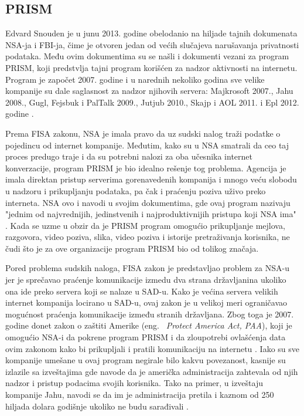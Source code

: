 \documentclass[a4paper]{article}
\begin{document}
\subsection{PRISM}
\label{subsec:prism}
Edvard Snouden je u junu 2013. godine obelodanio na hiljade tajnih dokumenata NSA-ja i FBI-ja, čime je otvoren jedan od većih slučajeva narušavanja privatnosti podataka. Među ovim dokumentima su se našli i dokumenti vezani za program PRISM, koji predstvlja tajni program korišćen za nadzor aktivnosti na internetu. Program je započet 2007. godine i u narednih nekoliko godina sve velike kompanije su dale saglasnost za nadzor njihovih servera: Majkrosoft 2007., Jahu 2008., Gugl, Fejsbuk i PalTalk 2009., Jutjub 2010., Skajp i AOL 2011. i Epl 2012. godine \cite{prism}. 
\par Prema FISA zakonu, NSA je imala pravo da uz sudski nalog traži podatke o pojedincu od internet kompanije. Međutim, kako su u NSA smatrali da ceo taj proces predugo traje i da su potrebni nalozi za oba učesnika internet konverzacije, program PRISM je bio idealno rešenje tog problema. Agencija je imala direktan pristup serverima gorenavedenih kompanija i mnogo veću slobodu u nadzoru i prikupljanju podataka, pa čak i praćenju poziva uživo preko interneta. NSA ovo i navodi u svojim dokumentima, gde ovaj program nazivaju "jednim od najvrednijih, jedinstvenih i najproduktivnijih pristupa koji NSA ima" \cite{prism}. Kada se uzme u obzir da je PRISM program omogućio prikupljanje mejlova, razgovora, video poziva, slika, video poziva i istorije pretraživanja korisnika, ne čudi što je za ove organizacije program PRISM bio od tolikog značaja.
\par Pored problema sudskih naloga, FISA zakon je predstavljao problem za NSA-u jer je sprečavao praćenje komunikacije izmedu dva strana državljanina ukoliko ona ide preko servera koji se nalaze u SAD-u. Kako je većina servera velikih internet kompanija locirano u SAD-u, ovaj zakon je u velikoj meri ograničavao mogućnost praćenja komunikacije između stranih državljana. Zbog toga je 2007. godine donet zakon o zaštiti Amerike (eng. ~{\em Protect America Act, PAA}), koji je omogućio NSA-i da pokrene program PRISM i da zloupotrebi ovlašćenja data ovim zakonom kako bi prikupljali i pratili komunikaciju na internetu \cite{prism1}. Iako su sve kompanije umešane u ovaj program negirale bilo kakvu povezanost, kasnije su izlazile sa izveštajima gde navode da je američka administracija zahtevala od njih nadzor i pristup podacima svojih korisnika. Tako na primer, u izveštaju kompanije Jahu, navodi se da im je administracija pretila i kaznom od 250 hiljada dolara godišnje ukoliko ne budu sarađivali \cite{prism2}. 
\end{document}
